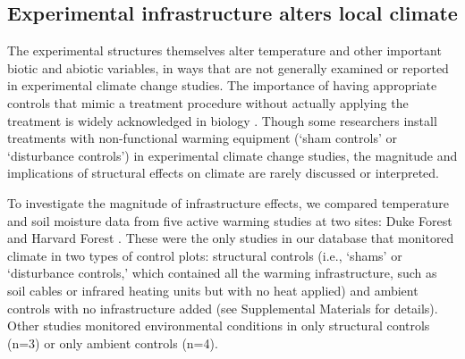 \documentclass{article}
\begin{document}
\subsection* {Experimental infrastructure alters local climate}
The experimental structures themselves alter temperature and other important biotic and abiotic variables, in ways that are not generally examined or reported in experimental climate change studies. The importance of having appropriate controls that mimic a treatment procedure without actually applying the treatment is widely acknowledged in biology \citep[e.g.,][]{spector2001,johnson2002,quinn2002}. Though some researchers install treatments with non-functional warming equipment (`sham controls' or `disturbance controls') in experimental climate change studies, the magnitude and implications of structural effects on climate are rarely discussed or interpreted.
\par To investigate the magnitude of infrastructure effects, we compared temperature and soil moisture data from five active warming studies at two sites: Duke Forest and Harvard Forest \citep{farnsworth1995,clark2014a, marchin2015, pelini2011}. These were the only studies in our database that monitored climate in two types of control plots: structural controls (i.e., `shams' or `disturbance controls,' which contained all the warming infrastructure, such as soil cables or infrared heating units but with no heat applied) and ambient controls with no infrastructure added (see Supplemental Materials for details). Other studies monitored environmental conditions in only structural controls (n=3) or only ambient controls (n=4).
\end{document}
